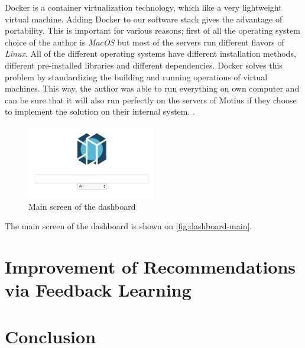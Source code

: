 Docker is a container virtualization technology, which like a very lightweight virtual machine. Adding Docker to our software stack gives the advantage of portability. This is important for various reasons; first of all the operating system choice of the author is \textit{MacOS} but most of the servers run different flavors of \textit{Linux}. All of the different operating systems have different installation methods, different pre-installed libraries and different dependencies. Docker solves this problem by standardizing the building and running operations of virtual machines. This way, the author was able to run everything on own computer and can be sure that it will also run perfectly on the servers of Motius if they choose to implement the solution on their internal system. \cite{anderson2015docker}.

 \begin{figure}[!ht]
	\centering
	\includegraphics[width=0.5\textwidth]{figures/DashboardMain.png}
	\caption{Main screen of the dashboard}
	\label{fig:dashboard-main}
\end{figure}


The main screen of the dashboard is shown on \autoref{fig:dashboard-main}.


\section{Improvement of Recommendations via Feedback Learning}

\section{Conclusion}

